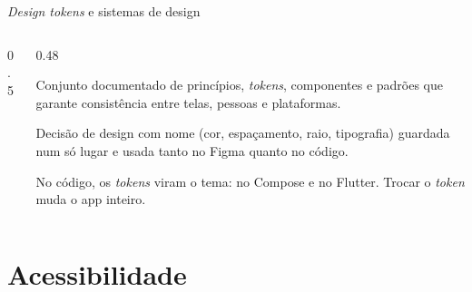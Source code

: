 \documentclass[aspectratio=169,10pt]{beamer}
\begin{document}
\begin{frame}{\emph{Design tokens} e sistemas de design}
  \begin{columns}[c]
    \begin{column}{0.5\textwidth}
      \centering
    \end{column}
    \begin{column}{0.48\textwidth}
      \begin{definicao}
        Conjunto documentado de princípios, \emph{tokens}, componentes e padrões que garante consistência entre telas, pessoas e plataformas.
      \end{definicao}
      \begin{definicao}
        Decisão de design com nome (cor, espaçamento, raio, tipografia) guardada num só lugar e usada tanto no Figma quanto no código.
      \end{definicao}
      \begin{dica}
        No código, os \emph{tokens} viram o tema:  no Compose e  no Flutter. Trocar o \emph{token} muda o app inteiro.
      \end{dica}
    \end{column}
  \end{columns}
\end{frame}

\section{Acessibilidade}
\end{document}
